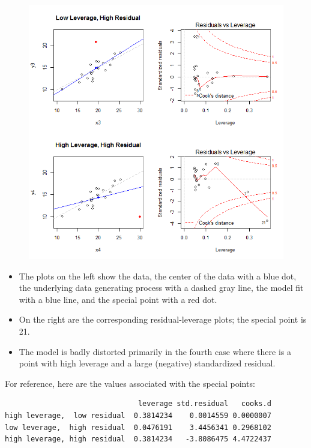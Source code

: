 \documentclass[residuals.tex]{subfiles}
\begin{document}
\begin{figure}[h!]
\centering
\includegraphics[width=1.0\linewidth]{plots3}
\caption{}
\label{fig:plots3}
\end{figure}
\newpage
\begin{itemize}
\item The plots on the left show the data, the center of the data  with a blue dot, the underlying data generating process with a dashed gray line, the model fit with a blue line, and the special point with a red dot. 
\item On the right are the corresponding residual-leverage plots; the special point is 21. 
\item The model is badly distorted primarily in the fourth case where there is a point with high leverage and a large (negative) standardized residual. 

\end{itemize}

For reference, here are the values associated with the special points:
\begin{verbatim}
                               leverage std.residual   cooks.d
high leverage,  low residual  0.3814234    0.0014559 0.0000007
low leverage,  high residual  0.0476191    3.4456341 0.2968102
high leverage, high residual  0.3814234   -3.8086475 4.4722437
\end{verbatim}
\end{document}
